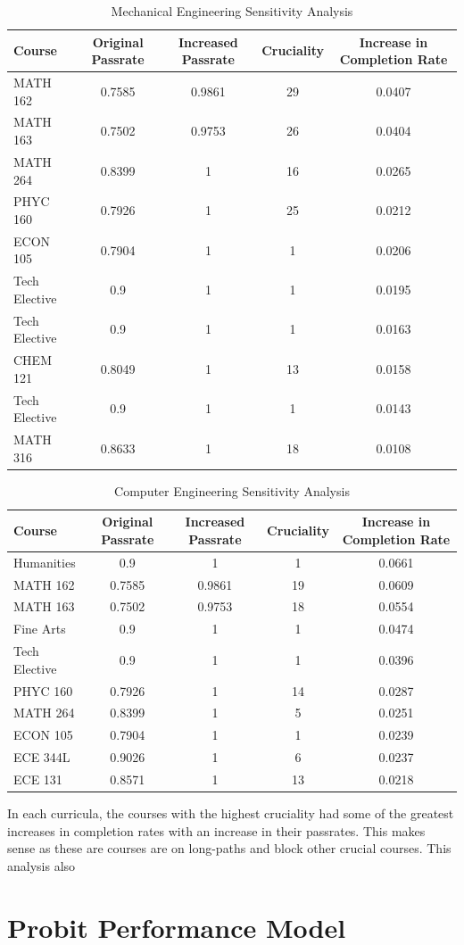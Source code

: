 \documentclass[botnum, fleqn]{unmeethesis}
\begin{document}
\begin{table}[!h]
\tiny
\begin{tabular}{l*{4}{c}}
Course & Original Passrate & Increased Passrate & Cruciality & Increase in Completion Rate \\
\hline
MATH 162 & 0.7585 & 0.9861 & 29 & 0.0407 \\
MATH 163 & 0.7502 & 0.9753 & 26 & 0.0404 \\
MATH 264 & 0.8399 & 1 & 16 & 0.0265 \\
PHYC 160 & 0.7926 & 1 & 25 & 0.0212 \\
ECON 105 & 0.7904 & 1 & 1 & 0.0206 \\
Tech Elective & 0.9 & 1 & 1 & 0.0195 \\
Tech Elective & 0.9 & 1 & 1 & 0.0163 \\
CHEM 121 & 0.8049 & 1 & 13 & 0.0158 \\
Tech Elective & 0.9 & 1 & 1 & 0.0143 \\
MATH 316 & 0.8633 & 1 & 18 & 0.0108 \\
\end{tabular}
\caption{Mechanical Engineering Sensitivity Analysis}
\label{tab:me_sensitivity}
\end{table}

\begin{table}[!h]
\tiny
\begin{tabular}{l*{4}{c}}
Course & Original Passrate & Increased Passrate & Cruciality & Increase in Completion Rate \\
\hline
Humanities & 0.9 & 1 & 1 & 0.0661 \\
MATH 162 & 0.7585 & 0.9861 & 19 & 0.0609 \\
MATH 163 & 0.7502 & 0.9753 & 18 & 0.0554 \\
Fine Arts & 0.9 & 1 & 1 & 0.0474 \\
Tech Elective & 0.9 & 1 & 1 & 0.0396 \\
PHYC 160 & 0.7926 & 1 & 14 & 0.0287 \\
MATH 264 & 0.8399 & 1 & 5 & 0.0251 \\
ECON 105 & 0.7904 & 1 & 1 & 0.0239 \\
ECE 344L & 0.9026 & 1 & 6 & 0.0237 \\
ECE 131 & 0.8571 & 1 & 13 & 0.0218 \\
\end{tabular}
\caption{Computer Engineering Sensitivity Analysis}
\label{tab:cpe_sensitivity}
\end{table}

In each curricula, the courses with the highest cruciality had some of the greatest increases in completion rates with an increase in their passrates. This makes sense as these are courses are on long-paths and block other crucial courses. This analysis also 

\section{Probit Performance Model}
\end{document}
